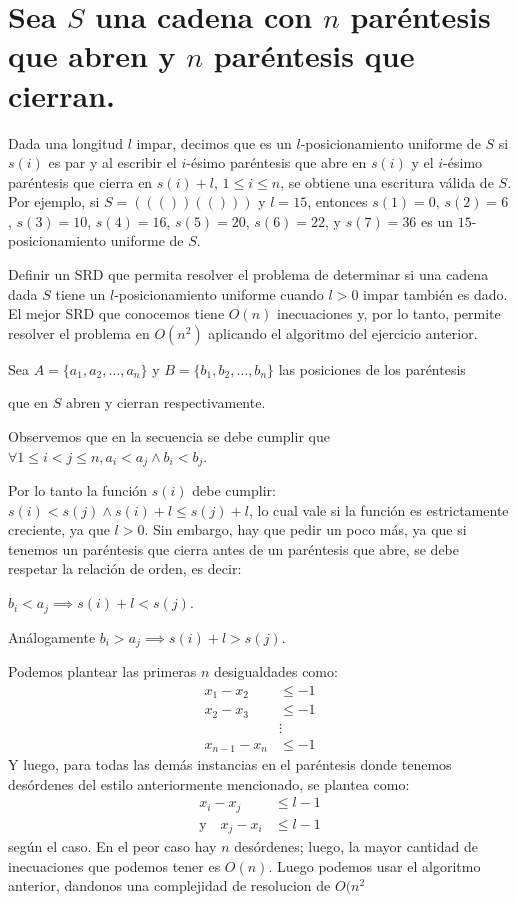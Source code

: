 \documentclass{article}
\begin{document}
\section*{Sea \( S \) una cadena con \( n \) paréntesis que abren y \( n \) paréntesis que cierran.}

Dada una longitud \( l \) impar, decimos que es un \( l \)-posicionamiento uniforme de \( S \) si \( s(i) \) es par y al escribir el \( i \)-ésimo paréntesis que abre en \( s(i) \) y el \( i \)-ésimo paréntesis que cierra en \( s(i) + l \), \(1 \leq i \leq n\), se obtiene una escritura válida de \( S \). Por ejemplo, si \( S = ((())(())) \) y \( l = 15 \), entonces \( s(1) = 0 \), \( s(2) = 6 \), \( s(3) = 10 \), \( s(4) = 16 \), \( s(5) = 20 \), \( s(6) = 22 \), y \( s(7) = 36 \) es un \( 15 \)-posicionamiento uniforme de \( S \).

Definir un SRD que permita resolver el problema de determinar si una cadena dada \( S \) tiene un \( l \)-posicionamiento uniforme cuando \( l > 0 \) impar también es dado. El mejor SRD que conocemos tiene \( O(n) \) inecuaciones y, por lo tanto, permite resolver el problema en \( O(n^{2}) \) aplicando el algoritmo del ejercicio anterior.

Sea \( A = \{a_1, a_2, \ldots, a_n\} \) y \( B = \{b_1, b_2, \ldots, b_n\} \) las posiciones de los paréntesis 

que en \( S \) abren y cierran respectivamente.

Observemos que en la secuencia se debe cumplir que \( \forall 1 \leq i < j \leq n, a_i < a_j \land b_i < b_j \).

Por lo tanto la función \( s(i) \) debe cumplir: \( s(i) < s(j) \land s(i) + l \leq s(j) + l \), lo cual vale si la función es estrictamente creciente, ya que \( l > 0 \). Sin embargo, hay que pedir un poco más, ya que si tenemos un paréntesis que cierra antes de un paréntesis que abre, se debe respetar la relación de orden, es decir:

\( b_i < a_j \implies s(i) + l < s(j) \).

Análogamente \( b_i > a_j \implies s(i) + l > s(j) \).

Podemos plantear las primeras \( n \) desigualdades como:
\[
\begin{aligned}
x_1  - x_2 &\leq -1 \\
x_2 - x_3 &\leq -1 \\
&\vdots \\
x_{n-1} - x_n &\leq -1
\end{aligned}
\]
Y luego, para todas las demás instancias en el paréntesis donde tenemos desórdenes del estilo anteriormente mencionado, se plantea como:
\[
\begin{aligned}
x_i - x_j &\leq l - 1 \\
\text{y} \quad x_j - x_i &\leq l -1
\end{aligned}
\]
según el caso. En el peor caso hay \( n \) desórdenes; luego, la mayor cantidad de inecuaciones que podemos tener es \( O(n) \). Luego podemos usar el algoritmo anterior, dandonos una complejidad de resolucion de \( O(n^{2} \)
\end{document}
